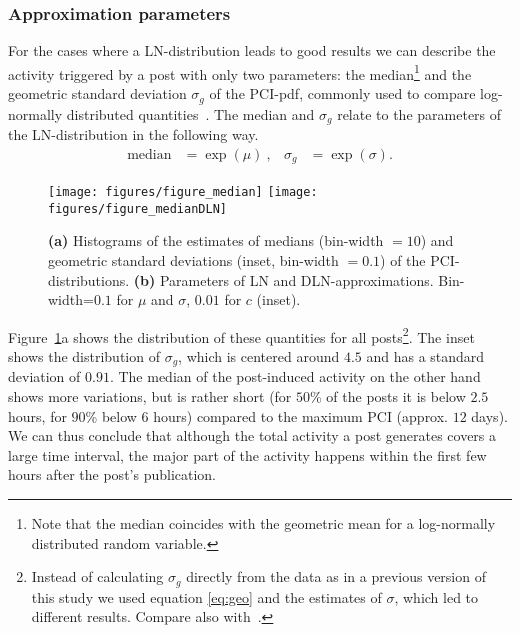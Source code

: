 \documentclass[twoside,11pt]{article}
\begin{document}
\subsubsection{Approximation parameters}\noindent
For the cases where a LN-distribution leads to good results we can
describe the activity triggered by a post with only two parameters:
the median\footnote{Note that the median coincides with the geometric
  mean for a log-normally distributed random variable.}  and the
geometric standard deviation $\sigma_g$ of the PCI-pdf, commonly used
to compare log-normally distributed quantities~\citep{LimpertSA01}.
The median and $\sigma_g$ relate to the parameters of the
LN-distribution in the following way.
\begin{align}
\mbox{median}&=\exp(\mu)~,  &\sigma_g&=\exp(\sigma).
\label{eq:geo}
\end{align}

\begin{figure}[!htb]\centering
  \texttt{[image: figures/figure\_median]}
  \texttt{[image: figures/figure\_medianDLN]}
  \caption{\textbf{(a)} Histograms of the estimates of medians
    (bin-width $=10$) and geometric standard deviations (inset,
    bin-width $=0.1$) of the PCI-distributions.  \textbf{(b)}
    Parameters of LN and DLN-approximations.  Bin-width=$0.1$ for
    $\mu$ and $\sigma$, $0.01$ for $c$ (inset).  }
\label{fig:hist_median}
\end{figure}

Figure~\ref{fig:hist_median}a shows the distribution of these
quantities for all posts\footnote{Instead of calculating $\sigma_g$
  directly from the data as in a previous version of this study
  \citep{kaltenbrunner_saw2007} we used equation \eqref{eq:geo} and the
  estimates of $\sigma$, which led to different results. Compare also
  with~\citet{LimpertSA01}.}.  The inset shows the distribution of
$\sigma_g$, which is centered around $4.5$ and has a standard
deviation of $0.91$. The median of the post-induced activity on the
other hand shows more variations, but is rather short (for $50$\% of
the posts it is below $2.5$ hours, for $90$\% below $6$ hours)
compared to the maximum PCI (approx. $12$ days). We can thus conclude
that although the total activity a post generates covers a large time
interval, the major part of the activity happens within the first few
hours after the post's publication.
\end{document}
